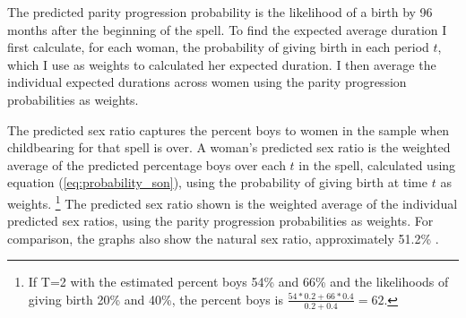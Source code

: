 \documentclass[12pt,letterpaper]{article}
\begin{document}
The predicted parity progression probability is the likelihood of a birth by 96 months 
after the beginning of the spell.
To find the expected average duration I first calculate, for each woman, the probability 
of giving birth in each period $t$, which I use as weights to calculated her expected 
duration. 
I then average the individual expected durations across women using the parity progression
probabilities as weights.

The predicted sex ratio captures the percent boys to women in the sample when 
childbearing for that spell is over.
A woman's predicted sex ratio is the weighted average of the predicted percentage boys 
over each $t$ in the spell, calculated using equation (\ref{eq:probability_son}), using
the probability of giving birth at time $t$ as weights.%
\footnote{
If T=2 with the estimated percent boys 54\% and 66\% and the likelihoods of giving 
birth 20\% and 40\%, the percent boys is $\frac{54*0.2+66*0.4}{0.2+0.4} = 62$.
}
The predicted sex ratio shown is the weighted average of the individual predicted sex 
ratios, using the parity progression probabilities as weights.
For comparison, the graphs also show the natural sex ratio, approximately 51.2\% 
\citep{ben-porath76b,jacobsen99,Portner2015b}.



\end{document}

